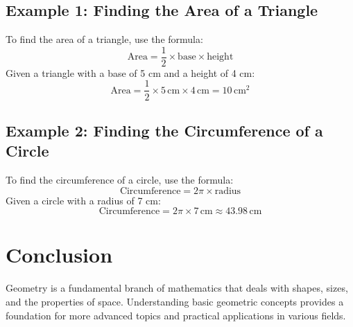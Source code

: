 \documentclass[12pt]{article}
\begin{document}
\subsection*{Example 1: Finding the Area of a Triangle}
To find the area of a triangle, use the formula:
\[
\text{Area} = \frac{1}{2} \times \text{base} \times \text{height}
\]
Given a triangle with a base of 5 cm and a height of 4 cm:
\[
\text{Area} = \frac{1}{2} \times 5 \, \text{cm} \times 4 \, \text{cm} = 10 \, \text{cm}^2
\]

\subsection*{Example 2: Finding the Circumference of a Circle}
To find the circumference of a circle, use the formula:
\[
\text{Circumference} = 2 \pi \times \text{radius}
\]
Given a circle with a radius of 7 cm:
\[
\text{Circumference} = 2 \pi \times 7 \, \text{cm} \approx 43.98 \, \text{cm}
\]

\section*{Conclusion}
Geometry is a fundamental branch of mathematics that deals with shapes, sizes, and the properties of space. Understanding basic geometric concepts provides a foundation for more advanced topics and practical applications in various fields.
\end{document}
